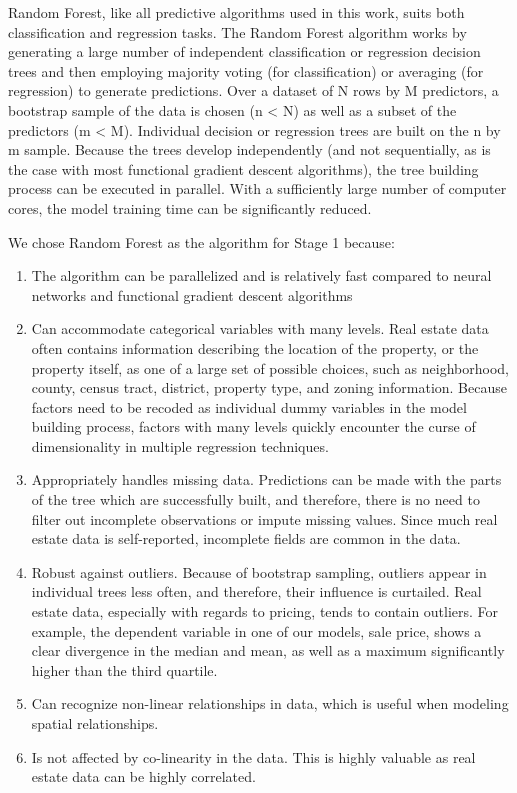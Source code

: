 \documentclass[conference,final,]{IEEEtran}
\providecommand{\tightlist}{%
  \setlength{\itemsep}{0pt}\setlength{\parskip}{0pt}}
\begin{document}
Random Forest, like all predictive algorithms used in this work, suits
both classification and regression tasks. The Random Forest algorithm
works by generating a large number of independent classification or
regression decision trees and then employing majority voting (for
classification) or averaging (for regression) to generate predictions.
Over a dataset of N rows by M predictors, a bootstrap sample of the data
is chosen (n \textless{} N) as well as a subset of the predictors (m
\textless{} M). Individual decision or regression trees are built on the
n by m sample. Because the trees develop independently (and not
sequentially, as is the case with most functional gradient descent
algorithms), the tree building process can be executed in parallel. With
a sufficiently large number of computer cores, the model training time
can be significantly reduced.

We chose Random Forest as the algorithm for Stage 1 because:

\begin{enumerate}
\def\labelenumi{\arabic{enumi})}
\tightlist
\item
  The algorithm can be parallelized and is relatively fast compared to
  neural networks and functional gradient descent algorithms
\item
  Can accommodate categorical variables with many levels. Real estate
  data often contains information describing the location of the
  property, or the property itself, as one of a large set of possible
  choices, such as neighborhood, county, census tract, district,
  property type, and zoning information. Because factors need to be
  recoded as individual dummy variables in the model building process,
  factors with many levels quickly encounter the curse of dimensionality
  in multiple regression techniques.
\item
  Appropriately handles missing data. Predictions can be made with the
  parts of the tree which are successfully built, and therefore, there
  is no need to filter out incomplete observations or impute missing
  values. Since much real estate data is self-reported, incomplete
  fields are common in the data.
\item
  Robust against outliers. Because of bootstrap sampling, outliers
  appear in individual trees less often, and therefore, their influence
  is curtailed. Real estate data, especially with regards to pricing,
  tends to contain outliers. For example, the dependent variable in one
  of our models, sale price, shows a clear divergence in the median and
  mean, as well as a maximum significantly higher than the third
  quartile.
\item
  Can recognize non-linear relationships in data, which is useful when
  modeling spatial relationships.
\item
  Is not affected by co-linearity in the data. This is highly valuable
  as real estate data can be highly correlated.
\end{enumerate}
\end{document}
